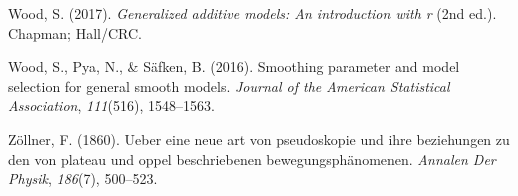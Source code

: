 \documentclass[print]{nuthesis}
\newlength{\cslhangindent}
\newenvironment{CSLReferences}[2]%
{\setlength{\parindent}{0pt}%
\everypar{\setlength{\hangindent}{\cslhangindent}}\ignorespaces}%
{\par}
\begin{document}
\begin{CSLReferences}{1}{0}
\leavevmode{}%
Wood, S. (2017). \emph{Generalized additive models: An introduction with r} (2nd ed.). Chapman; Hall/CRC.

\leavevmode{}%
Wood, S., Pya, N., \& Säfken, B. (2016). Smoothing parameter and model selection for general smooth models. \emph{Journal of the American Statistical Association}, \emph{111}(516), 1548--1563.

\leavevmode{}%
Zöllner, F. (1860). Ueber eine neue art von pseudoskopie und ihre beziehungen zu den von plateau und oppel beschriebenen bewegungsph{ä}nomenen. \emph{Annalen Der Physik}, \emph{186}(7), 500--523.

\end{CSLReferences}


\backmatter

% 






\end{document}
